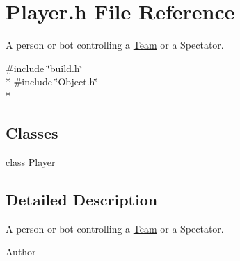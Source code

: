 \section{Player.\-h File Reference}
\label{_player_8h}


A person or bot controlling a \hyperlink{class_team}{Team} or a Spectator.  


{\ttfamily \#include \char`\"{}build.\-h\char`\"{}}\\*
{\ttfamily \#include \char`\"{}Object.\-h\char`\"{}}\\*
\subsection*{Classes}
\begin{DoxyCompactItemize}
\item 
class \hyperlink{class_player}{Player}
\end{DoxyCompactItemize}


\subsection{Detailed Description}
A person or bot controlling a \hyperlink{class_team}{Team} or a Spectator. \begin{DoxyAuthor}{Author}

\end{DoxyAuthor}
